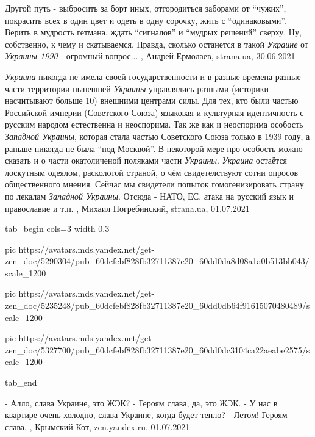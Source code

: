 Другой путь - выбросить за борт иных, отгородиться заборами от \enquote{чужих},
покрасить всех в один цвет и одеть в одну сорочку, жить с \enquote{одинаковыми}. Верить
в мудрость гетмана, ждать \enquote{сигналов} и \enquote{мудрых решений} сверху.  Ну,
собственно, к чему и скатываемся. Правда, сколько останется в такой \emph{Украине} от
\emph{Украины-1990} - огромный вопрос...
, 
Андрей Ермолаев, strana.ua, 30.06.2021

\emph{Украина} никогда не имела своей государственности и в разные времена разные
части территории нынешней \emph{Украины} управлялись разными (историки насчитывают
больше 10) внешними центрами силы. Для тех, кто были частью Российской империи
(Советского Союза) языковая и культурная идентичность с русским народом
естественна и неоспорима. Так же как и неоспорима особость \emph{Западной Украины},
которая стала частью Советского Союза только в 1939 году, а раньше никогда не
была \enquote{под Москвой}. В некоторой мере про особость можно сказать и о части
окатоличеной поляками части \emph{Украины}. \emph{Украина} остаётся лоскутным одеялом,
расколотой страной, о чём свидетелствуют сотни опросов общественного мнения.
Сейчас мы свидетели попыток гомогенизировать страну по лекалам \emph{Западной
Украины}. Отсюда - НАТО, ЕС, атака на русский язык и православие и т.п.
, 
Михаил Погребинский, strana.ua, 01.07.2021


\ifcmt
  tab_begin cols=3
     width 0.3

     pic https://avatars.mds.yandex.net/get-zen_doc/5290304/pub_60dcfebf828fb32711387e20_60dd0da8d08a1a0b513bb043/scale_1200

     pic https://avatars.mds.yandex.net/get-zen_doc/5235248/pub_60dcfebf828fb32711387e20_60dd0db64f91615070480489/scale_1200

     pic https://avatars.mds.yandex.net/get-zen_doc/5327700/pub_60dcfebf828fb32711387e20_60dd0dc3104ca22aeabe2575/scale_1200

  tab_end
\fi

\obeycr
  - Алло, слава Украине, это ЖЭК?
  - Героям слава, да, это ЖЭК.
  - У нас в квартире очень холодно, слава Украине, когда будет тепло?
  - Летом! Героям слава.
\restorecr
, 
Крымский Кот, zen.yandex.ru, 01.07.2021


